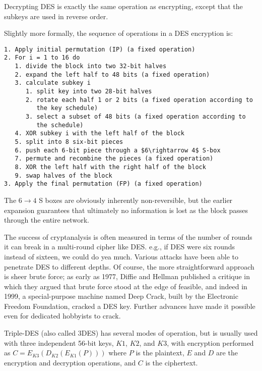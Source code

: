 \documentclass[%
 aip,
 jmp,%
 amsmath,amssymb,
 reprint,%
]{revtex4-1}
\begin{document}
Decrypting DES is exactly the same operation as encrypting, except
that the subkeys are used in reverse order.

Slightly more formally, the sequence of operations in a DES encryption
is:

\begin{widetext}
\begin{verbatim}
1. Apply initial permutation (IP) (a fixed operation)
2. For i = 1 to 16 do
   1. divide the block into two 32-bit halves
   2. expand the left half to 48 bits (a fixed operation)
   3. calculate subkey i
      1. split key into two 28-bit halves
      2. rotate each half 1 or 2 bits (a fixed operation according to
         the key schedule)
      3. select a subset of 48 bits (a fixed operation according to
         the schedule)
   4. XOR subkey i with the left half of the block
   5. split into 8 six-bit pieces
   6. push each 6-bit piece through a $6\rightarrow 4$ S-box
   7. permute and recombine the pieces (a fixed operation)
   8. XOR the left half with the right half of the block
   9. swap halves of the block
3. Apply the final permutation (FP) (a fixed operation)
\end{verbatim}
\end{widetext}

The $6 \rightarrow 4$ S boxes are obviously inherently non-reversible,
but the earlier expansion guarantees that ultimately no information is
lost as the block passes through the entire network.

The success of cryptanalysis is often measured in terms of the number
of rounds it can break in a multi-round cipher like DES.  e.g., if DES
were six rounds instead of sixteen, we could do yea much.  Various
attacks have been able to penetrate DES to different depths.  Of
course, the more straightforward approach is sheer brute force; as
early as 1977, Diffie and Hellman published a critique in which they
argued that brute force stood at the edge of feasible, and indeed in
1999, a special-purpose machine named Deep Crack, built by the
Electronic Freedom Foundation, cracked a DES key.  Further advances
have made it possible even for dedicated hobbyists to crack.

Triple-DES (also called 3DES) has several modes of operation, but is
usually used with three independent 56-bit keys, $K1$, $K2$, and $K3$,
with encryption performed as $C = E_{K3}(D_{K2}(E_{K1}(P)))$ where $P$
is the plaintext, $E$ and $D$ are the encryption and decryption
operations, and $C$ is the ciphertext.
\end{document}
